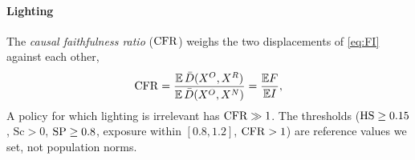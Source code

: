 \paragraph{Lighting}
The \emph{causal faithfulness ratio} ($\mathrm{CFR}$) weighs the two displacements of \eqref{eq:FI} against
each other,
\begin{equation}
\mathrm{CFR}=\frac{\mathbb{E}\,\bar D(X^{O},X^{R})}{\mathbb{E}\,\bar D(X^{O},X^{N})}=\frac{\mathbb{E}F}{\mathbb{E}I},
\label{eq:cfr}
\end{equation}
A policy for which lighting is irrelevant has $\mathrm{CFR}\gg1$. The thresholds ($\mathrm{HS}\ge0.15$, $\mathrm{Sc}>0$, $\mathrm{SP}\ge0.8$, exposure within $[0.8,1.2]$, $\mathrm{CFR}>1$) are reference values we set, not population norms.
